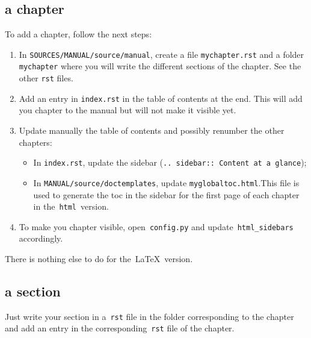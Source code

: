 \documentclass[a4paper,10pt]{article}
\newcommand{\code}[1]{\texttt{#1}}
\begin{document}
\subsection{a chapter}
To add a chapter, follow the next steps:
\begin{enumerate}
 \item In \code{SOURCES/MANUAL/source/manual}, create a file \code{mychapter.rst} and a folder \code{mychapter} where you will write the different sections of the chapter. See the other \code{rst} files.
 \item Add an entry in \code{index.rst} in the table of contents at the end. This will add you chapter to the manual but will not make it visible yet.
 \item Update manually the table of contents and possibly renumber the other chapters:
       \begin{itemize}
        \item In \code{index.rst}, update the sidebar (\code{.. sidebar:: Content at a glance});
        \item In \code{MANUAL/source/doctemplates}, update \code{myglobaltoc.html}.This file is used to generate the toc in the sidebar for the first page of each chapter in the~\code{html}~version.
       \end{itemize}
 \item To make you chapter visible, open~\code{config.py} and update~\code{html\_sidebars} accordingly.
\end{enumerate}

There is nothing else to do for the~\LaTeX\ version.

\subsection{a section}

Just write your section in a~\code{rst} file in the folder corresponding to the chapter and add an entry in the corresponding~\code{rst} file of the chapter.
\end{document}
